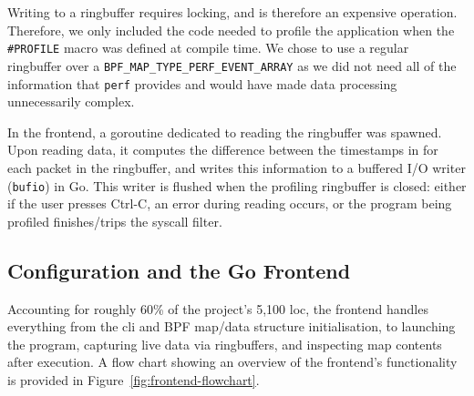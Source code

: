 Writing to a ringbuffer requires locking, and is therefore an expensive
operation. Therefore, we only included the code needed to profile the
application when the \texttt{\#PROFILE} macro was defined at compile time.
We chose to use a regular ringbuffer over a 
\texttt{BPF\_MAP\_TYPE\_PERF\_EVENT\_ARRAY} as we did not need all of the
information that \texttt{perf} provides and would have made data processing
unnecessarily complex.

In the frontend, a goroutine dedicated to reading the ringbuffer was spawned.
Upon reading data, it computes the difference between the timestamps in for each 
packet in the ringbuffer, and writes this information to a buffered \ac{I/O} 
writer (\texttt{bufio}) in Go. This writer is flushed when the profiling 
ringbuffer is closed: either if the user presses Ctrl-C, an error during 
reading occurs, or the program being profiled finishes/trips the syscall 
filter.

\subsection{Configuration and the Go Frontend}\label{subsec:impl-frontend}

Accounting for roughly 60\% of the project's 5,100 \ac{loc}, the frontend handles 
everything from the \ac{cli} and BPF  map/data structure initialisation, to 
launching the program, capturing live data via ringbuffers, and inspecting 
map contents after execution. A flow chart showing an overview of the frontend's
functionality is provided in Figure~\ref{fig:frontend-flowchart}.

